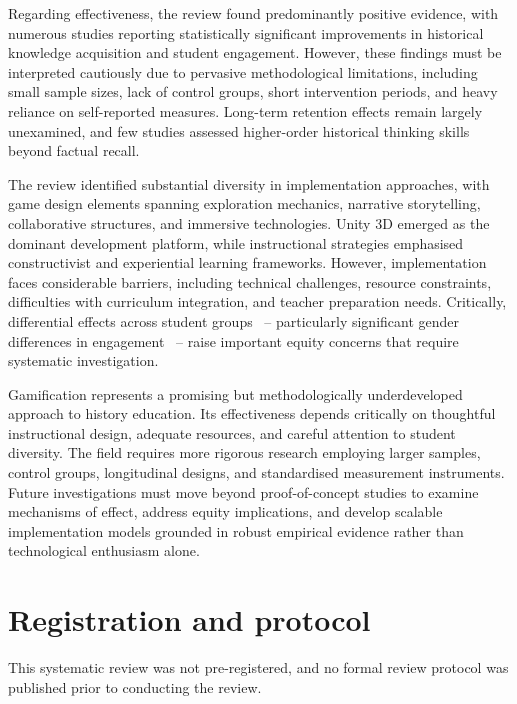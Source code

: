 \documentclass[a4paper,fleqn]{cas-sc}
\begin{document}
Regarding effectiveness, the review found predominantly positive evidence, with numerous studies reporting statistically significant improvements in historical knowledge acquisition and student engagement. However, these findings must be interpreted cautiously due to pervasive methodological limitations, including small sample sizes, lack of control groups, short intervention periods, and heavy reliance on self-reported measures. Long-term retention effects remain largely unexamined, and few studies assessed higher-order historical thinking skills beyond factual recall.

The review identified substantial diversity in implementation approaches, with game design elements spanning exploration mechanics, narrative storytelling, collaborative structures, and immersive technologies. Unity 3D emerged as the dominant development platform, while instructional strategies emphasised constructivist and experiential learning frameworks. However, implementation faces considerable barriers, including technical challenges, resource constraints, difficulties with curriculum integration, and teacher preparation needs. Critically, differential effects across student groups ~--  particularly significant gender differences in engagement ~--  raise important equity concerns that require systematic investigation.

Gamification represents a promising but methodologically underdeveloped approach to history education. Its effectiveness depends critically on thoughtful instructional design, adequate resources, and careful attention to student diversity. The field requires more rigorous research employing larger samples, control groups, longitudinal designs, and standardised measurement instruments. Future investigations must move beyond proof-of-concept studies to examine mechanisms of effect, address equity implications, and develop scalable implementation models grounded in robust empirical evidence rather than technological enthusiasm alone.



\section*{Registration and protocol}

This systematic review was not pre-registered, and no formal review protocol was published prior to conducting the review.
\end{document}
